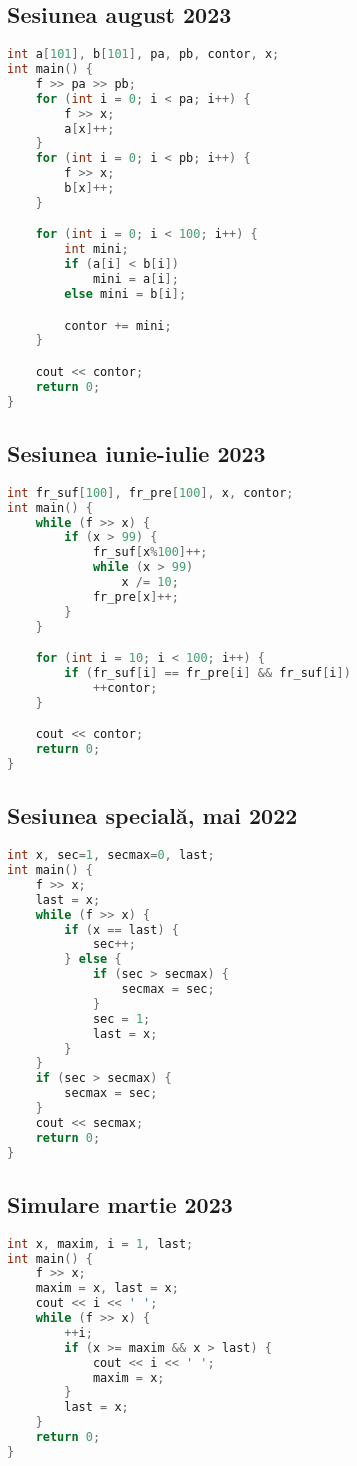 \documentclass[10pt, a4paper, twocolumn]{article}
\begin{document}
\subsection*{Sesiunea august 2023}
\begin{lstlisting}[language=C++]
int a[101], b[101], pa, pb, contor, x;
int main() {
    f >> pa >> pb;
    for (int i = 0; i < pa; i++) {
        f >> x;
        a[x]++;
    }
    for (int i = 0; i < pb; i++) {
        f >> x;
        b[x]++;
    }

    for (int i = 0; i < 100; i++) {
        int mini;
        if (a[i] < b[i])
            mini = a[i];
        else mini = b[i];

        contor += mini;
    }

    cout << contor;
    return 0;
}
\end{lstlisting}

\newpage
\subsection*{Sesiunea iunie-iulie 2023}
\begin{lstlisting}[language=C++]
int fr_suf[100], fr_pre[100], x, contor;
int main() {
    while (f >> x) {
        if (x > 99) {
            fr_suf[x%100]++;
            while (x > 99)
                x /= 10;
            fr_pre[x]++;
        }
    }

    for (int i = 10; i < 100; i++) {
        if (fr_suf[i] == fr_pre[i] && fr_suf[i])
            ++contor;
    }

    cout << contor;
    return 0;
}
\end{lstlisting}


\subsection*{Sesiunea specială, mai 2022}
\begin{lstlisting}[language=C++]
int x, sec=1, secmax=0, last;
int main() {
    f >> x;
    last = x;
    while (f >> x) {
        if (x == last) {
            sec++;
        } else {
            if (sec > secmax) {
                secmax = sec;
            }
            sec = 1;
            last = x;
        }
    }
    if (sec > secmax) {
        secmax = sec;
    }
    cout << secmax;
    return 0;
}
\end{lstlisting}


\subsection*{Simulare martie 2023}
\begin{lstlisting}[language=C++]
int x, maxim, i = 1, last;
int main() {
    f >> x;
    maxim = x, last = x;
    cout << i << ' ';
    while (f >> x) {
        ++i;
        if (x >= maxim && x > last) {
            cout << i << ' ';
            maxim = x;
        }
        last = x;
    }
    return 0;
}
\end{lstlisting}
\vspace{2cm}
\end{document}
